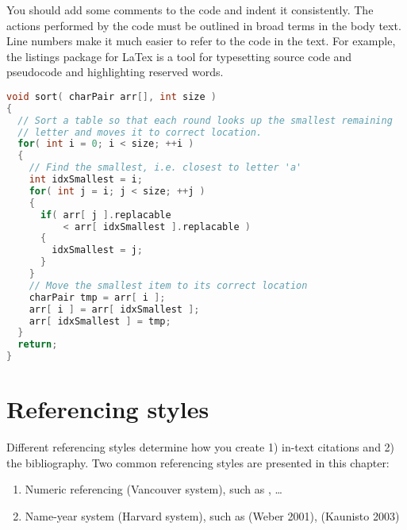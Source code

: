\documentclass[twoside,draftfooter]{tutthesis} %
\newif\ifnameyear
\begin{document}
You should add some comments to the code and indent it consistently.
The actions performed by the code must be outlined in broad terms in the body text.
Line numbers make it much easier to refer to the code in the text.
For example, the listings package for LaTex \citep{Heinz2006, Oetiker2011} is a tool for typesetting source code and pseudocode and highlighting reserved words.

\iftrue %
\begin{lstlisting}[float,caption={Example of presenting program code as a figure in a thesis.},label={lst:sort},language=C]
void sort( charPair arr[], int size )
{
  // Sort a table so that each round looks up the smallest remaining
  // letter and moves it to correct location.
  for( int i = 0; i < size; ++i )
  {
    // Find the smallest, i.e. closest to letter 'a'
    int idxSmallest = i;
    for( int j = i; j < size; ++j )
    {
      if( arr[ j ].replacable
          < arr[ idxSmallest ].replacable )
      {
        idxSmallest = j;
      }
    }
    // Move the smallest item to its correct location
    charPair tmp = arr[ i ];
    arr[ i ] = arr[ idxSmallest ];
    arr[ idxSmallest ] = tmp;
  }
  return;
}
\end{lstlisting}
\else
\label{lst:sort}
Code example commented out in this version. Load the \texttt{listings} package if you are using code listings.
\fi




\chapter{Referencing styles}
\label{ch:referencingstyles}

Different referencing styles determine how you create 1) in-text citations and 2) the bibliography.
Two common referencing styles are presented in this chapter:
\begin{enumerate}
\ifnameyear
  \item Numeric referencing (Vancouver system), such as [1], [2]\ldots
  \item Name-year system (Harvard system), such as \citep{Weber2001}, \citep{Kaunisto2003}
\else
  \item Numeric referencing (Vancouver system), such as \cite{Weber2001}, \cite{Kaunisto2003}\ldots
  \item Name-year system (Harvard system), such as (Weber 2001), (Kaunisto 2003)
\fi
\end{enumerate}
\end{document}

